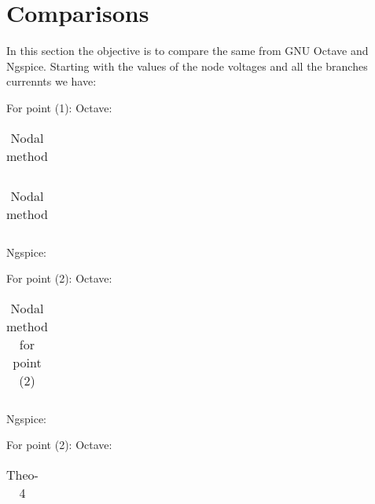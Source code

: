 \section{Comparisons}
\label{sec:comparisons}

In this section the objective is to compare the same from GNU Octave and Ngspice. 
Starting with the values of the node voltages and all the branches currennts we have: 

\vspace{0.5cm}
For point (1):
Octave: 
\FloatBarrier
\begin{table}[h]
  \centering
  \begin{tabular}{|c|c|c|c|c|c|c|}
    \hline    
    
    \hline
  \end{tabular}
  \caption{Nodal method}
  \label{tab:nodal}
\end{table}
\FloatBarrier  

\FloatBarrier
\begin{table}[h]
  \centering
  \begin{tabular}{|c|c|c|c|c|c|c|}
    \hline    
    
    \hline
  \end{tabular}
  \caption{Nodal method}
  \label{tab:nodal}
\end{table}
\FloatBarrier 

Ngspice: 




\vspace{0.5cm} 
For point (2): 
Octave:
\vspace{0.2cm}
\FloatBarrier
\begin{table}[h]
  \centering
  \begin{tabular}{|c|c|c|c|c|c|c|}
    \hline    
    
    \hline
  \end{tabular}
  \caption{Nodal method for point (2)}
  \label{tab:nodal}
\end{table}
\FloatBarrier   

Ngspice:








\vspace{0.5cm} 
For point (2): 
Octave:
\vspace{0.2cm}
\FloatBarrier
\begin{table}[h]
  \centering
  \begin{tabular}{|c|c|c|c|c|c|c|}
    \hline    
    
    \hline
  \end{tabular}
  \caption{Theo-4}
  \label{tab:nodal}
\end{table}
\FloatBarrier 




















